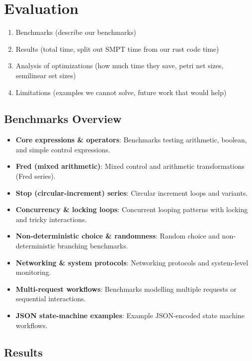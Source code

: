 \section{Evaluation}
\label{sec:evaluation}

\begin{enumerate}
    \item Benchmarks (describe our benchmarks)
    \item Results (total time, split out SMPT time from our rust code time)
    \item Analysis of optimizations (how much time they save, petri net sizes, semilinear set sizes)
    \item Limitations (examples we cannot solve, future work that would help)
\end{enumerate}


\subsection{Benchmarks Overview}
\label{subsec:benchmarks}

\begin{itemize}
	\item \textbf{Core expressions \& operators}: Benchmarks testing arithmetic, boolean, and simple control expressions.
	\item \textbf{Fred (mixed arithmetic)}: Mixed control and arithmetic transformations (Fred series).
	\item \textbf{Stop (circular-increment) series}: Circular increment loops and variants.
	\item \textbf{Concurrency \& locking loops}: Concurrent looping patterns with locking and tricky interactions.
	\item \textbf{Non-deterministic choice \& randomness}: Random choice and non-deterministic branching benchmarks.
	\item \textbf{Networking \& system protocols}: Networking protocols and system-level monitoring.
	\item \textbf{Multi-request workflows}: Benchmarks modelling multiple requests or sequential interactions.
	\item \textbf{JSON state-machine examples}: Example JSON-encoded state machine workflows.
\end{itemize}


\subsection{Results}


